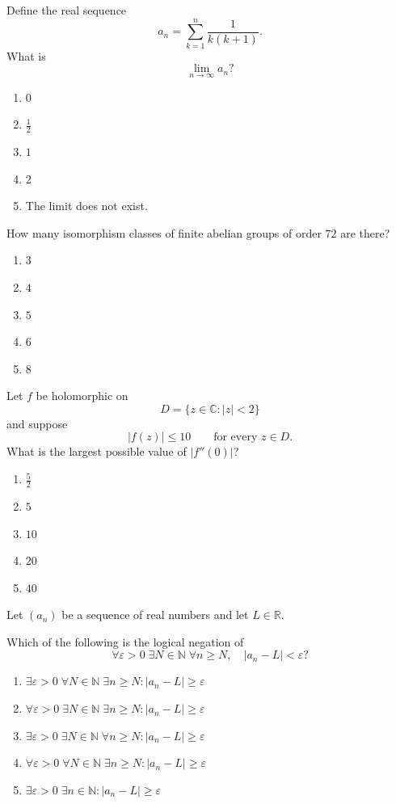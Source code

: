 \begin{exercise}
Define the real sequence
\[
a_n=\sum_{k=1}^{n}\frac1{k(k+1)}.
\]
What is
\[
\lim_{n\to\infty}a_n?
\]
\begin{enumerate}[label=(\Alph*)]
\item $0$
\item $\frac12$
\item $1$
\item $2$
\item The limit does not exist.
\end{enumerate}
\end{exercise}

\begin{exercise}
How many isomorphism classes of finite
abelian groups of order $72$ are there?
\begin{enumerate}[label=(\Alph*)]
\item $3$
\item $4$
\item $5$
\item $6$
\item $8$
\end{enumerate}
\end{exercise}

\begin{exercise}
Let $f$ be holomorphic on
\[
D=\{z\in\mathbb C:|z|<2\}
\]
and suppose
\[
|f(z)|\leq10
\qquad\text{for every }z\in D.
\]
What is the largest possible value
of $|f''(0)|$?
\begin{enumerate}[label=(\Alph*)]
\item $\frac52$
\item $5$
\item $10$
\item $20$
\item $40$
\end{enumerate}
\end{exercise}

\begin{exercise}
Let $(a_n)$ be a sequence of real numbers
and let $L\in\mathbb R$.

Which of the following is the logical
negation of
\[
\forall\varepsilon>0\;
\exists N\in\mathbb N\;
\forall n\geq N,\quad
|a_n-L|<\varepsilon?
\]
\begin{enumerate}[label=(\Alph*)]
\item $\exists\varepsilon>0\;
\forall N\in\mathbb N\;
\exists n\geq N:
|a_n-L|\geq\varepsilon$

\item $\forall\varepsilon>0\;
\exists N\in\mathbb N\;
\exists n\geq N:
|a_n-L|\geq\varepsilon$

\item $\exists\varepsilon>0\;
\exists N\in\mathbb N\;
\forall n\geq N:
|a_n-L|\geq\varepsilon$

\item $\forall\varepsilon>0\;
\forall N\in\mathbb N\;
\exists n\geq N:
|a_n-L|\geq\varepsilon$

\item $\exists\varepsilon>0\;
\exists n\in\mathbb N:
|a_n-L|\geq\varepsilon$
\end{enumerate}
\end{exercise}

